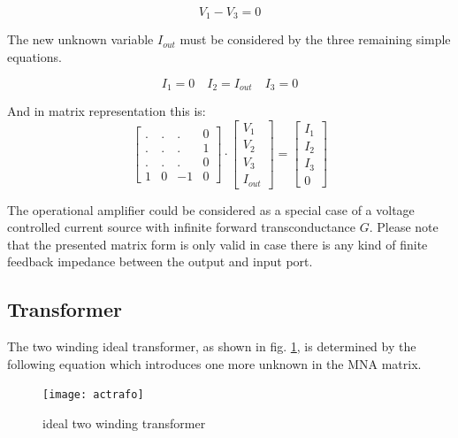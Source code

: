 \begin{equation}
V_{1} - V_{3} = 0
\label{eq:opamp}
\end{equation}

The new unknown variable $I_{out}$ must be considered by the three
remaining simple equations.

\begin{equation}
I_{1} = 0 \quad I_{2} = I_{out} \quad I_{3} = 0
\end{equation}

And in matrix representation this is:
\begin{equation}
\begin{bmatrix}
.&.&.& 0\\
.&.&.& 1\\
.&.&.& 0\\
1 & 0 & -1 & 0
\end{bmatrix}
\cdot
\begin{bmatrix}
V_{1}\\
V_{2}\\
V_{3}\\
I_{out}
\end{bmatrix}
=
\begin{bmatrix}
I_{1}\\
I_{2}\\
I_{3}\\
0
\end{bmatrix}
\end{equation}

The operational amplifier could be considered as a special case of a
voltage controlled current source with infinite forward
transconductance $G$.  Please note that the presented matrix form is
only valid in case there is any kind of finite feedback impedance
between the output and input port.

\subsection{Transformer}

The two winding ideal transformer, as shown in fig.
\ref{fig:actrafo}, is determined by the following equation which
introduces one more unknown in the MNA matrix.

\begin{figure}[ht]
\begin{center}
\texttt{[image: actrafo]}
\end{center}
\caption{ideal two winding transformer}
\label{fig:actrafo}
\end{figure}
\FloatBarrier

